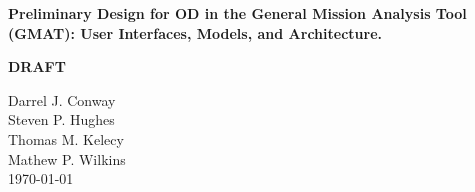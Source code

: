 

\vspace{2 in}

\begin{center}
{\renewcommand{\thefootnote}{\fnsymbol{footnote}} { \Huge \bf
Preliminary Design for OD in  the General Mission Analysis Tool
(GMAT): User Interfaces, Models, and Architecture. }}
\end{center}
\begin{center}
{\renewcommand{\thefootnote}{\fnsymbol{footnote}} { \Huge \bf
 DRAFT }}
\end{center}

\vspace{1 in}

\begin{center}
{\renewcommand{\thefootnote}{\fnsymbol{footnote}} { \large
 Darrel J. Conway\\
  Steven P. Hughes\\
  Thomas M. Kelecy\\
 Mathew P. Wilkins\\
 \normalsize \vspace{.5 in}
 \today
  }}
\end{center}




\clearpage \mbox{}\clearpage
